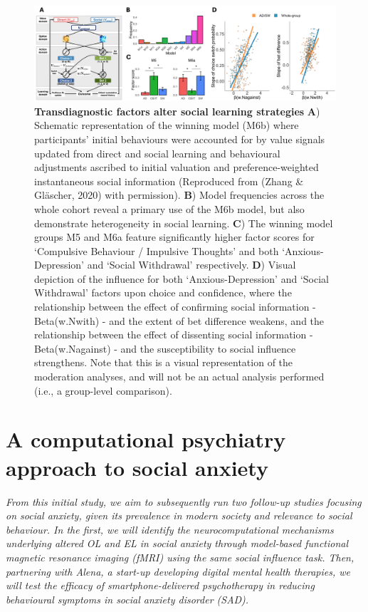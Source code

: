\documentclass[12pt,a4paper,oneside,]{book} %
\begin{document}
\begin{figure}
\includegraphics[width=1\linewidth]{figures/predicted_results} \caption{{\textbf{Transdiagnostic factors alter social learning strategies} \textbf{A}) Schematic representation of the winning model (M6b) where participants' initial behaviours were accounted for by value signals updated from direct and social learning and behavioural adjustments ascribed to initial valuation and preference-weighted instantaneous social information (Reproduced from (Zhang \& Gläscher, 2020) with permission). \textbf{B}) Model frequencies across the whole cohort reveal a primary use of the M6b model, but also demonstrate heterogeneity in social learning. \textbf{C}) The winning model groups M5 and M6a feature significantly higher factor scores for `Compulsive Behaviour / Impulsive Thoughts' and both `Anxious-Depression' and `Social Withdrawal' respectively. \textbf{D}) Visual depiction of the influence for both `Anxious-Depression' and `Social Withdrawal' factors upon choice and confidence, where the relationship between the effect of confirming social information - Beta(w.Nwith) - and the extent of bet difference weakens, and the relationship between the effect of dissenting social information - Beta(w.Nagainst) - and the susceptibility to social influence strengthens. Note that this is a visual representation of the moderation analyses, and will not be an actual analysis performed (i.e., a group-level comparison).}}\label{fig:figure-5-results}
\end{figure}



\chapter{A computational psychiatry approach to social anxiety}\label{a-computational-psychiatry-approach-to-social-anxiety}

\chaptermark{}

\noindent  \emph{From this initial study, we aim to subsequently run two follow-up studies focusing on social anxiety, given its prevalence in modern society and relevance to social behaviour. In the first, we will identify the neurocomputational mechanisms underlying altered OL and EL in social anxiety through model-based functional magnetic resonance imaging (fMRI) using the same social influence task. Then, partnering with Alena, a start-up developing digital mental health therapies, we will test the efficacy of smartphone-delivered psychotherapy in reducing behavioural symptoms in social anxiety disorder (SAD).}
\end{document}
